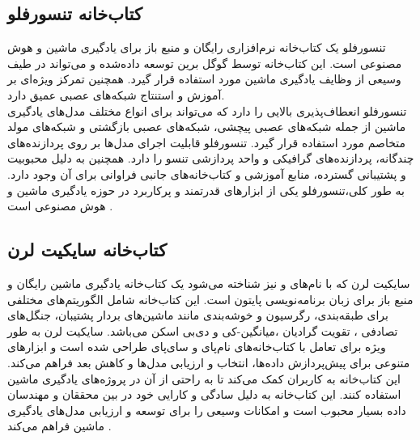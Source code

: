\subsection[کتاب‌خانه تنسورفلو]{کتاب‌خانه تنسورفلو ‌\protect{}}
تنسورفلو یک کتاب‌خانه نرم‌افزاری رایگان و منبع باز برای یادگیری ماشین و هوش مصنوعی است. این کتاب‌خانه توسط گوگل برین توسعه داده‌شده و می‌تواند در طیف وسیعی 
از وظایف یادگیری ماشین مورد استفاده قرار گیرد. همچنین تمرکز ویژه‌ای بر آموزش و استنتاج شبکه‌های عصبی عمیق دارد. 
\\
تنسورفلو انعطاف‌پذیری بالایی را دارد که می‌تواند برای انواع مختلف مدل‌های یادگیری ماشین از جمله شبکه‌های عصبی پیچشی، شبکه‌های عصبی بازگشتی و شبکه‌های مولد متخاصم مورد استفاده قرار گیرد.
تنسورفلو قابلیت اجرای مدل‌ها بر روی پردازنده‌های چندگانه، پردازنده‌های گرافیکی و واحد پردازشی تنسو را دارد. همچنین به دلیل محبوبیت و پشتیبانی گسترده،
منابع آموزشی و کتاب‌خانه‌های جانبی فراوانی برای آن وجود دارد. به طور کلی،تنسورفلو یکی از ابزارهای قدرتمند و پرکاربرد در حوزه یادگیری ماشین و هوش مصنوعی است \cite{Introduc60:online}.


\subsection[کتاب‌خانه سایکیت لرن]{کتاب‌خانه سایکیت لرن\protect{}}
سایکیت لرن که با نام‌های  و  نیز شناخته می‌شود یک کتاب‌خانه یادگیری ماشین رایگان و منبع باز برای زبان برنامه‌نویسی پایتون است. این کتاب‌خانه شامل الگوریتم‌های مختلفی برای طبقه‌بندی،
رگرسیون و خوشه‌بندی مانند ماشین‌های بردار پشتیبان، جنگل‌های تصادفی
، تقویت گرادیان
،میانگین-کی  و دی‌بی اسکن می‌باشد. سایکیت لرن به طور ویژه برای تعامل با
کتاب‌خانه‌های  نام‌پای و سای‌پای طراحی شده است و ابزارهای متنوعی برای پیش‌پردازش داده‌ها، انتخاب و ارزیابی مدل‌ها و کاهش بعد فراهم می‌کند. این کتاب‌خانه به کاربران کمک می‌کند تا به راحتی از آن در پروژه‌های 
یادگیری ماشین استفاده کنند. این کتاب‌خانه به دلیل سادگی و کارایی خود در بین محققان و مهندسان داده بسیار محبوب است و امکانات وسیعی را برای توسعه و ارزیابی مدل‌های یادگیری ماشین فراهم می‌کند \cite{scikitle22:online}.

